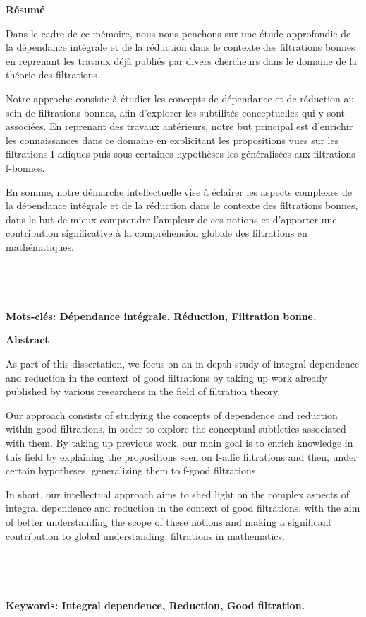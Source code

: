 \newpage
{}
\begin{center}
	\LARGE{\textbf{Résumé}}
\end{center}

Dans le cadre de ce mémoire, nous nous penchons sur une étude approfondie de la dépendance intégrale et de la réduction dans le contexte des filtrations bonnes en reprenant les travaux déjà publiés par divers chercheurs dans le domaine de la théorie des filtrations.

Notre approche consiste à étudier les concepts de dépendance et de réduction au sein de filtrations bonnes, afin d'explorer les subtilités conceptuelles qui y sont associées. En reprenant des travaux antérieurs, notre but principal est d'enrichir les connaissances dans ce domaine en explicitant les propositions vues sur les filtrations I-adiques puis sous certaines hypothèses les généralisées aux filtrations f-bonnes.

En somme, notre démarche intellectuelle vise à éclairer les aspects complexes de la dépendance intégrale et de la réduction dans le contexte des filtrations bonnes, dans le but de mieux comprendre l'ampleur de ces notions et d'apporter une contribution significative à la compréhension globale des filtrations en mathématiques.
\\
\\
\\
\\
\\
\textbf{ Mots-clés: Dépendance intégrale, Réduction, Filtration bonne.} 



\newpage
{}
\begin{center}
	\LARGE{\textbf{Abstract}}
\end{center}

As part of this dissertation, we focus on an in-depth study of integral dependence and reduction in the context of good filtrations by taking up work already published by various researchers in the field of filtration theory.

Our approach consists of studying the concepts of dependence and reduction within good filtrations, in order to explore the conceptual subtleties associated with them. By taking up previous work, our main goal is to enrich knowledge in this field by explaining the propositions seen on I-adic filtrations and then, under certain hypotheses, generalizing them to f-good filtrations.

In short, our intellectual approach aims to shed light on the complex aspects of integral dependence and reduction in the context of good filtrations, with the aim of better understanding the scope of these notions and making a significant contribution to global understanding. filtrations in mathematics.
\\
\\
\\
\\
\\
\textbf{Keywords: Integral dependence, Reduction, Good filtration.} 
